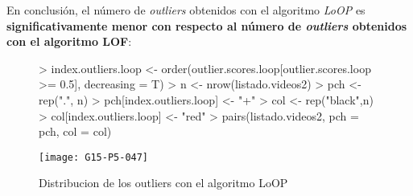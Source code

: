 \documentclass [a4paper] {article}
\begin{document}
En conclusión, el número de \textit{outliers} obtenidos con el algoritmo \textit{LoOP} es \textbf{significativamente menor con respecto al número de \textit{outliers} obtenidos con el algoritmo LOF}:
\begin{figure}[htbp!]
\centering
\begin{Schunk}
\begin{Sinput}
> index.outliers.loop <- order(outlier.scores.loop[outlier.scores.loop >= 0.5], decreasing = T)
> n <- nrow(listado.videos2)
> pch <- rep(".", n)
> pch[index.outliers.loop] <- "+"
> col <- rep("black",n)
> col[index.outliers.loop] <- "red"
> pairs(listado.videos2, pch = pch, col = col)
\end{Sinput}
\end{Schunk}
\texttt{[image: G15-P5-047]}
\caption{Distribucion de los outliers con el algoritmo LoOP}
\end{figure}
\end{document}
